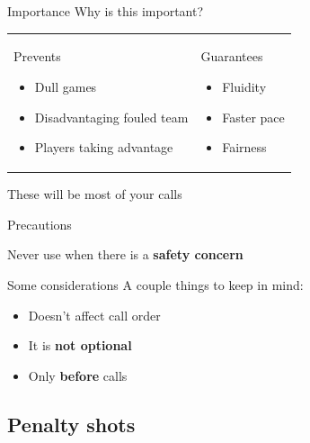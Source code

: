 \documentclass{beamer}
\begin{document}
	\begin{frame}{Importance}
		Why is this important? \pause

		\begin{tabular}{ll}
			\parbox{0.5\textwidth}
			{
				\begin{center}
					Prevents
				\end{center}
				\begin{itemize}
					\item Dull games
					\item Disadvantaging fouled team
					\item Players taking advantage
				\end{itemize}
			}
			\pause
			&
			\parbox{0.5\textwidth}
			{
				\begin{center}
					Guarantees
				\end{center}
				\begin{itemize}
					\item Fluidity
					\item Faster pace
					\item Fairness
				\end{itemize}
			}
		\end{tabular}
		\pause
		\begin{center}
			These will be most of your calls
		\end{center}
	\end{frame}

	\begin{frame}{Precautions}
		\begin{center}
			Never use when there is a \textbf{safety concern}
		\end{center}
	\end{frame}

	\begin{frame}{Some considerations}
		A couple things to keep in mind:
		\begin{itemize}
			\item Doesn't affect call order \pause
			\item It is \textbf{not optional} \pause
			\item Only \textbf{before} calls
		\end{itemize}
	\end{frame}

	\subsection{Penalty shots}
\end{document}
